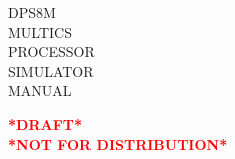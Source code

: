 \thispagestyle{empty}

\begin{flushleft}
	\mybox{\textbf{\Huge \textcolor{white}{HARDWARE}}}
\end{flushleft}

\begin{flushleft}
	\Huge
	\hspace{14ex}DPS8M \\
	\hspace{14ex}MULTICS \\
	\hspace{14ex}PROCESSOR \\
	\hspace{14ex}SIMULATOR \\
	\hspace{14ex}MANUAL
	\begin{center}
	\textbf{\textcolor{red}{*DRAFT*}} \\
	\textbf{\textcolor{red}{*NOT FOR DISTRIBUTION*}}
	\end{center}
\end{flushleft}

\vfill
\mybox{
	\begin{flushright}
		{\textbf{\Huge \textcolor{white}{SIMULATOR}}}
	\end{flushright}
}
